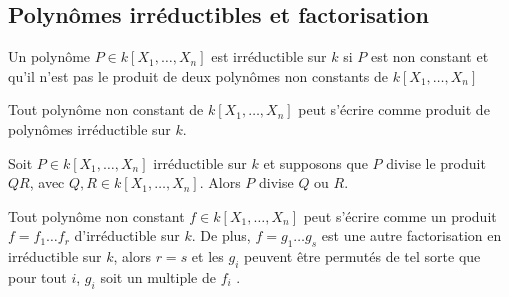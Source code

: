 \subsection{Polyn\^omes irr\'eductibles et factorisation}
 \begin{Def}
 Un polyn\^ome $P \in k[X_1,\ldots,X_n]$ est irr\'eductible sur $k$ si $P$ est non constant et qu'il n'est pas le produit de deux polyn\^omes non constants de $k[X_1,\ldots,X_n]$
 \end{Def} 
\begin{prop}
 Tout polyn\^ome non constant de $k[X_1,\ldots,X_n]$ peut s'\'ecrire comme produit de polyn\^omes irr\'eductible sur $k$. 
\end{prop}
 \begin{Thm} 
Soit $P \in k[X_1,\ldots,X_n]$ irr\'eductible sur $k$ et supposons que $P$ divise le produit $QR$, avec $Q,R \in k[X_1,\ldots,X_n]$. Alors $P$ divise $Q$ ou $R$. 
\end{Thm} 
\begin{Thm} 
 Tout polyn\^ome non constant $f\in k[X_1,\ldots,X_n]$ peut s'\'ecrire comme un produit $f=f_1 \ldots f_r$ d'irr\'eductible sur $k$. De plus, $f=g_1\ldots g_s$ est une autre factorisation en irr\'eductible sur $k$, alors $r=s$ et les $g_i$ peuvent être permut\'es de tel sorte que pour tout $i$,  $g_i$ soit un multiple de $f_i$ . 
\end{Thm}